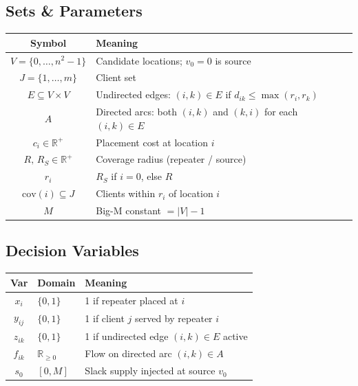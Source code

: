 \documentclass[10pt,a4paper,twocolumn]{article}
\begin{document}
\subsection{Sets \& Parameters}

\begin{center}
\renewcommand{\arraystretch}{1.18}
\fontsize{7.5pt}{9pt}\selectfont
\begin{tabular}{@{}cl@{}}
\toprule
\textbf{Symbol} & \textbf{Meaning} \\
\midrule
$V = \{0,\dots,n^2{-}1\}$    & Candidate locations; $v_0=0$ is source \\
$J = \{1,\dots,m\}$           & Client set \\
$E \subseteq V\!\times\!V$    & Undirected edges: $(i,k)\!\in\!E$ if
                                $d_{ik}\!\leq\!\max(r_i,r_k)$ \\
$A$                           & Directed arcs: both $(i,k)$ and $(k,i)$
                                for each $(i,k)\!\in\!E$ \\
$c_i \in \mathbb{R}^{+}$      & Placement cost at location $i$ \\
$R,\,R_S \in \mathbb{R}^{+}$  & Coverage radius (repeater / source) \\
$r_i$                         & $R_S$ if $i=0$, else $R$ \\
$\mathrm{cov}(i)\subseteq J$  & Clients within $r_i$ of location $i$ \\
$M$                           & Big-M constant $= |V|-1$ \\
\bottomrule
\end{tabular}
\end{center}

\subsection{Decision Variables}

\begin{center}
\renewcommand{\arraystretch}{1.18}
\fontsize{7.5pt}{9pt}\selectfont
\begin{tabular}{@{}cll@{}}
\toprule
\textbf{Var} & \textbf{Domain} & \textbf{Meaning} \\
\midrule
$x_i$    & $\{0,1\}$          & 1 if repeater placed at $i$ \\
$y_{ij}$ & $\{0,1\}$          & 1 if client $j$ served by repeater $i$ \\
$z_{ik}$ & $\{0,1\}$          & 1 if undirected edge $(i,k)\!\in\!E$ active \\
$f_{ik}$ & $\mathbb{R}_{\ge0}$& Flow on directed arc $(i,k)\!\in\!A$ \\
$s_0$    & $[0,M]$            & Slack supply injected at source $v_0$ \\
\bottomrule
\end{tabular}
\end{center}
\end{document}
